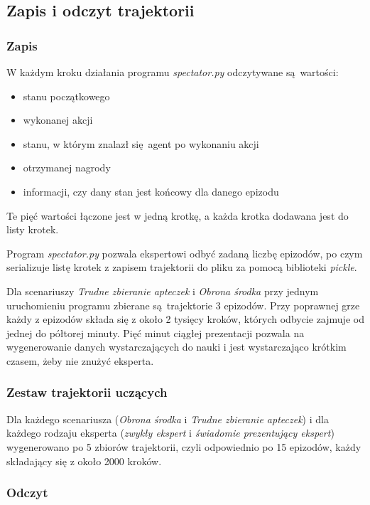\documentclass[polish,master,a4paper,oneside]{ppfcmthesis}
\begin{document}
\subsection{Zapis i odczyt trajektorii}
\subsubsection{Zapis}
W każdym kroku działania programu \textit{spectator.py} odczytywane są wartości:

\begin{itemize}
\item{stanu początkowego}
\item{wykonanej akcji}
\item{stanu, w którym znalazł się agent po wykonaniu akcji}
\item{otrzymanej nagrody}
\item{informacji, czy dany stan jest końcowy dla danego epizodu}
\end{itemize}

Te pięć wartości łączone jest w jedną krotkę, a każda krotka dodawana jest do listy krotek.

Program \textit{spectator.py} pozwala ekspertowi odbyć zadaną liczbę epizodów, po czym serializuje listę krotek z zapisem trajektorii do pliku za pomocą biblioteki \textit{pickle}.

Dla scenariuszy \textit{Trudne zbieranie apteczek} i \textit{Obrona środka} przy jednym uruchomieniu programu zbierane są trajektorie 3 epizodów. Przy poprawnej grze każdy z epizodów składa się z około 2 tysięcy kroków, których odbycie zajmuje od jednej do półtorej minuty. Pięć minut ciągłej prezentacji pozwala na wygenerowanie danych wystarczających do nauki i jest wystarczająco krótkim czasem, żeby nie znużyć eksperta.

\subsubsection{Zestaw trajektorii uczących}
Dla każdego scenariusza (\textit{Obrona środka} i \textit{Trudne zbieranie apteczek}) i dla każdego rodzaju eksperta (\textit{zwykły ekspert} i \textit{świadomie prezentujący ekspert}) wygenerowano po 5 zbiorów trajektorii, czyli odpowiednio po 15 epizodów, każdy składający się z około 2000 kroków.

\subsubsection{Odczyt}
\end{document}
